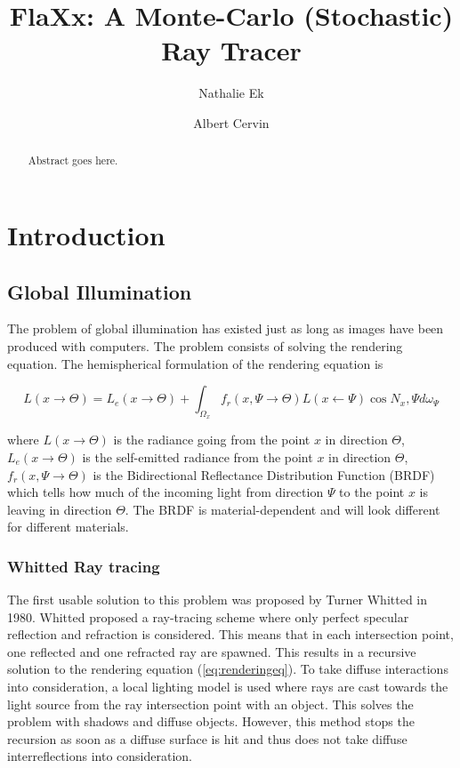 \documentclass[a4paper]{report}
\begin{document}
\title{FlaXx: A Monte-Carlo (Stochastic) Ray Tracer}
\author{Nathalie Ek \and Albert Cervin}

\maketitle

\begin{abstract}
Abstract goes here.
\end{abstract}

\tableofcontents

\listoffigures

\chapter{Introduction}

\section{Global Illumination}

The problem of global illumination has existed just as long as images
have been produced with computers. The problem consists of solving the
rendering equation. The hemispherical formulation of the rendering equation is

\begin{equation}
  L(x \to \Theta) = L_e(x \to \Theta) + \int_{\Omega_x}f_r(x,\Psi \to \Theta)L(x \gets \Psi)\cos{N_x,\Psi}d\omega_\Psi
  \label{eq:renderingeq}
\end{equation}

where \(L(x \to \Theta)\) is the radiance going from the point \(x\)
in direction \(\Theta\), \(L_e(x \to \Theta) \) is the self-emitted
radiance from the point \(x\) in direction \(\Theta\), \(f_r(x,\Psi
\to \Theta)\) is the Bidirectional Reflectance Distribution Function
(BRDF) which tells how much of the incoming light from direction
\(\Psi\) to the point \(x\) is leaving in direction \(\Theta\). The
BRDF is material-dependent and will look different for different materials.

\subsection{Whitted Ray tracing}

The first usable solution to this problem was proposed by Turner
Whitted \cite{whitted} in 1980. Whitted proposed a ray-tracing scheme
where only perfect specular reflection and refraction is
considered. This means that in each intersection point, one reflected
and one refracted ray are spawned. This results in a recursive
solution to the rendering equation (\ref{eq:renderingeq}). To take
diffuse interactions into consideration, a local
lighting model is used where rays are cast towards the light source
from the ray intersection point with an object. This solves the
problem with shadows and diffuse objects. However, this method stops
the recursion as soon as a diffuse surface is hit and thus does not
take diffuse interreflections into consideration.
\end{document}
